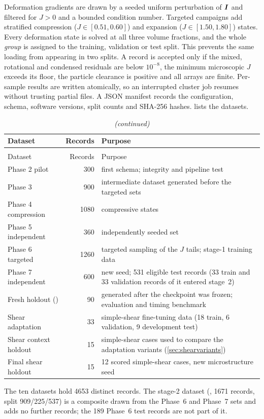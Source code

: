 Deformation gradients are drawn by a seeded uniform perturbation of $\bm I$ and
filtered for $J>0$ and a bounded condition number. Targeted campaigns add
stratified compression ($J\in[0.51,0.60]$) and expansion ($J\in[1.50,1.80]$)
states. Every deformation state is solved at all three volume fractions, and the
whole \emph{group} is assigned to the training, validation or test split. This
prevents the same loading from appearing in two splits. A record is accepted
only if the mixed, rotational and condensed residuals are below $10^{-8}$, the
minimum microscopic $J$ exceeds its floor, the particle clearance is positive and
all arrays are finite. Per-sample results are written atomically, so an
interrupted cluster job resumes without trusting partial files. A JSON manifest
records the configuration, schema, software versions, split counts and SHA-256
hashes.  lists the datasets.

{\small
\begin{xltabular}{\textwidth}{@{}lrX@{}}
\caption[Direct-RVE datasets]{Direct-RVE datasets (each record: $\Fbar$, $\vfrac$, $\Psibar$, $\Pbar$, $\Abar$, $\Rten$, residuals, diagnostics).}\label{tab:datasets}\\
\toprule
Dataset & Records & Purpose\\
\midrule
\endfirsthead
\caption[]{\emph{(continued)}}\\
\toprule
Dataset & Records & Purpose\\
\midrule
\endhead
\bottomrule
\endfoot
Phase 2 pilot & 300 & first schema; integrity and pipeline test\\
Phase 3 & 900 & intermediate dataset generated before the targeted sets\\
Phase 4 compression & 1080 & compressive states\\
Phase 5 independent & 360 & independently seeded set\\
Phase 6 targeted & 1260 & targeted sampling of the $J$ tails; stage-1 training data\\
Phase 7 independent & 600 & new seed; 531 eligible test records (33 train and 33 validation records of it entered stage~2)\\
Fresh holdout () & 90 & generated after the checkpoint was frozen; evaluation and timing benchmark\\
Shear adaptation & 33 & simple-shear fine-tuning data (18 train, 6 validation, 9 development test)\\
Shear context holdout & 15 & simple-shear cases used to compare the adaptation variants (\cref{sec:shearvariants})\\
Final shear holdout & 15 & 12 scored simple-shear cases, new microstructure seed\\
\end{xltabular}
}
The ten datasets hold 4653 distinct records. The stage-2 dataset
(, 1671 records, split 909/225/537) is a composite
drawn from the Phase~6 and Phase~7 sets and adds no further records; the 189 Phase~6
test records are not part of it.

